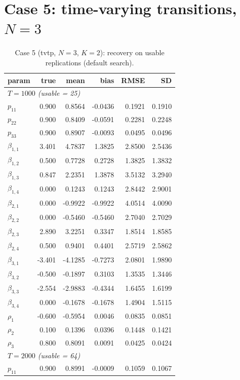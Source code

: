 \documentclass[11pt]{article}
\begin{document}
\section{Case 5: time-varying transitions, $N = 3$}\label{sec:case5}
\begin{table}[!htbp]\centering\small
\caption{Case 5 (tvtp, $N=3$, $K=2$): recovery on usable replications (default search).}\label{tab:c5}
\begin{tabular}{lrrrrr}
\toprule
param & true & mean & bias & RMSE & SD\\
\midrule\multicolumn{6}{l}{\emph{$T = 1000$ (usable = 25)}}\\
$p_{11}$ & 0.900 & 0.8564 & -0.0436 & 0.1921 & 0.1910\\
$p_{22}$ & 0.900 & 0.8409 & -0.0591 & 0.2281 & 0.2248\\
$p_{33}$ & 0.900 & 0.8907 & -0.0093 & 0.0495 & 0.0496\\
$\beta_{1,1}$ & 3.401 & 4.7837 & 1.3825 & 2.8500 & 2.5436\\
$\beta_{1,2}$ & 0.500 & 0.7728 & 0.2728 & 1.3825 & 1.3832\\
$\beta_{1,3}$ & 0.847 & 2.2351 & 1.3878 & 3.5132 & 3.2940\\
$\beta_{1,4}$ & 0.000 & 0.1243 & 0.1243 & 2.8442 & 2.9001\\
$\beta_{2,1}$ & 0.000 & -0.9922 & -0.9922 & 4.0514 & 4.0090\\
$\beta_{2,2}$ & 0.000 & -0.5460 & -0.5460 & 2.7040 & 2.7029\\
$\beta_{2,3}$ & 2.890 & 3.2251 & 0.3347 & 1.8514 & 1.8585\\
$\beta_{2,4}$ & 0.500 & 0.9401 & 0.4401 & 2.5719 & 2.5862\\
$\beta_{3,1}$ & -3.401 & -4.1285 & -0.7273 & 2.0801 & 1.9890\\
$\beta_{3,2}$ & -0.500 & -0.1897 & 0.3103 & 1.3535 & 1.3446\\
$\beta_{3,3}$ & -2.554 & -2.9883 & -0.4344 & 1.6455 & 1.6199\\
$\beta_{3,4}$ & 0.000 & -0.1678 & -0.1678 & 1.4904 & 1.5115\\
$\rho_1$ & -0.600 & -0.5954 & 0.0046 & 0.0835 & 0.0851\\
$\rho_2$ & 0.100 & 0.1396 & 0.0396 & 0.1448 & 0.1421\\
$\rho_3$ & 0.800 & 0.8091 & 0.0091 & 0.0425 & 0.0424\\
\midrule\multicolumn{6}{l}{\emph{$T = 2000$ (usable = 64)}}\\
$p_{11}$ & 0.900 & 0.8991 & -0.0009 & 0.1059 & 0.1067\\

\end{tabular}
\end{table}
\end{document}
